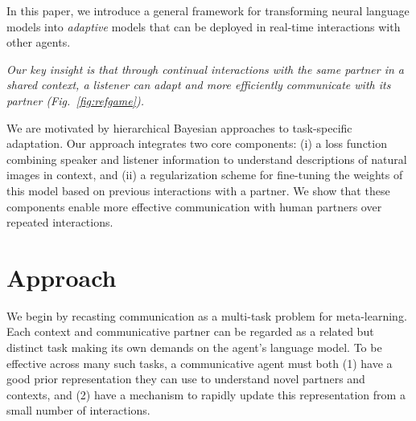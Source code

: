 In this paper, we introduce a general framework for transforming neural language models into \emph{adaptive} models that can be deployed in real-time interactions with other agents.

\emph{Our key insight is that through continual interactions with the same partner in a shared context, a listener can adapt and more efficiently communicate with its partner (Fig.~\ref{fig:refgame}).}

We are motivated by hierarchical Bayesian approaches to task-specific adaptation. Our approach integrates two core components: (i) a loss function combining speaker and listener information  
to understand descriptions of natural images in context, and (ii) a regularization scheme for fine-tuning the weights of this model based on previous interactions with a partner. %
We show that these components enable more effective communication with human partners over repeated interactions.

\section{Approach}
We begin by recasting communication as a multi-task problem for meta-learning. 
Each context and communicative partner can be regarded as a related but distinct task making its own demands on the agent's language model. 
To be effective across many such tasks, a communicative agent must both (1) have a good prior representation they can use to understand novel partners and contexts, and (2) have a mechanism to rapidly update this representation from a small number of interactions.

